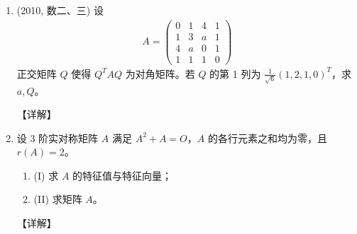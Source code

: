 \documentclass[12pt, a4paper, oneside, UTF8]{ctexbook}
\begin{document}
\begin{enumerate}[label=\arabic*.,start=11]
    \item (2010, 数二、三) 设
    \begin{align*}
    A = \begin{pmatrix}
    0 & 1 & 4 & 1 \\
    1 & 3 & a & 1 \\
    4 & a & 0 & 1 \\
    1 & 1 & 1 & 0
    \end{pmatrix}
    \end{align*}
    正交矩阵 $Q$ 使得 $Q^T A Q$ 为对角矩阵。若 $Q$ 的第 1 列为 $\frac{1}{\sqrt{6}}(1,2,1,0)^T$，求 $a, Q$。
    
    \begin{solution}
    【详解】
    \end{solution}
    
    \item 设 3 阶实对称矩阵 $A$ 满足 $A^2 + A = O$，$A$ 的各行元素之和均为零，且 $r(A) = 2$。
    \begin{enumerate}
        \item (I) 求 $A$ 的特征值与特征向量；
        \item (II) 求矩阵 $A$。
    \end{enumerate}
    
    \begin{solution}
    【详解】
    \end{solution}
\end{enumerate}

\ifx\allfiles\undefined
\end{document}
